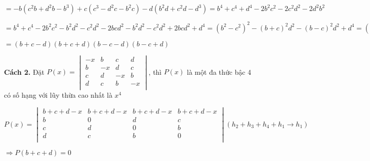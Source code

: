 \documentclass[12pt]{report}
\begin{document}
$= -b\left(c^2b+d^2b-b^3\right) + c\left(c^3-d^2c-b^2c\right) -d\left(b^2d+c^2d-d^3\right) = b^4+c^4+d^4-2b^2c^2-2c^2d^2-2d^2b^2$	

$= b^4+c^4-2b^2c^2-b^2d^2-c^2d^2-2bcd^2-b^2d^2-c^2d^2+2bcd^2+d^4 = \left(b^2-c^2\right)^2-\left(b+c\right)^2d^2-\left(b-c\right)^2d^2+d^4 = \left(b^2-c^2\right)^2d^2 - \left(b^2+c^2\right)^2d^2 - (b-c)^2d^2+d^4 = \lbrack (b+c)^2-d^2 \rbrack \lbrack (b-c)^2-d^2 \rbrack$

$= (b+c-d)(b+c+d)(b-c-d)(b-c+d)$

\textbf{Cách 2.} Đặt $P(x) = \begin{vmatrix}
-x & b & c & d \\
b & -x & d & c \\
c & d & -x & b \\
d & c & b & -x \\
\end{vmatrix}$, thì $P(x)$ là một đa thức bậc 4 có số hạng với lũy thừa cao nhất là $x^4$

$P(x) = \begin{vmatrix}
b+c+d-x & b+c+d-x & b+c+d-x & b+c+d-x \\
b & 0 & d & c \\
c & d & 0 & b \\
d & c & b & 0 \\
\end{vmatrix} (h_2+h_3+h_4+h_1 \to h_1)$

$\Rightarrow P(b+c+d) = 0$
\end{document}

